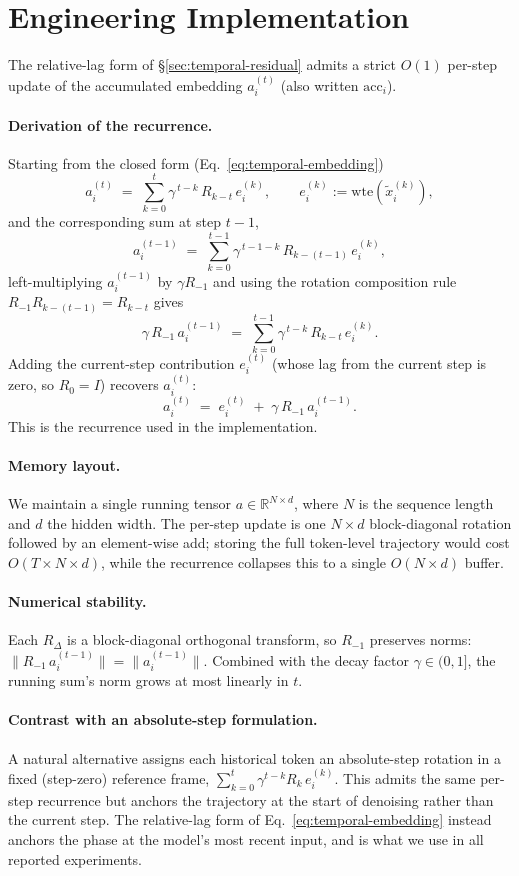 \section{Engineering Implementation}
\label{app:rope-engineering}

The relative-lag form of \S\ref{sec:temporal-residual} admits a strict $O(1)$ per-step update of the accumulated embedding $a_i^{(t)}$ (also written $\mathrm{acc}_i$).

\paragraph{Derivation of the recurrence.}
Starting from the closed form (Eq.~\eqref{eq:temporal-embedding})
\[
a_i^{(t)} \;=\; \sum_{k=0}^{t} \gamma^{\,t-k}\, R_{k-t}\, e_i^{(k)},
\qquad
e_i^{(k)} := \mathrm{wte}(\tilde{x}_i^{(k)}),
\]
and the corresponding sum at step $t-1$,
\[
a_i^{(t-1)} \;=\; \sum_{k=0}^{t-1} \gamma^{\,t-1-k}\, R_{k-(t-1)}\, e_i^{(k)},
\]
left-multiplying $a_i^{(t-1)}$ by $\gamma R_{-1}$ and using the rotation composition rule $R_{-1} R_{k-(t-1)} = R_{k-t}$ gives
\[
\gamma\, R_{-1}\, a_i^{(t-1)} \;=\; \sum_{k=0}^{t-1} \gamma^{\,t-k}\, R_{k-t}\, e_i^{(k)}.
\]
Adding the current-step contribution $e_i^{(t)}$ (whose lag from the current step is zero, so $R_0 = I$) recovers $a_i^{(t)}$:
\[
a_i^{(t)} \;=\; e_i^{(t)} \;+\; \gamma\, R_{-1}\, a_i^{(t-1)}.
\]
This is the recurrence used in the implementation.

\paragraph{Memory layout.}
We maintain a single running tensor $a \in \mathbb{R}^{N \times d}$, where $N$ is the sequence length and $d$ the hidden width. The per-step update is one $N \times d$ block-diagonal rotation followed by an element-wise add; storing the full token-level trajectory would cost $O(T \times N \times d)$, while the recurrence collapses this to a single $O(N \times d)$ buffer.

\paragraph{Numerical stability.}
Each $R_\Delta$ is a block-diagonal orthogonal transform, so $R_{-1}$ preserves norms: $\|R_{-1}\, a_i^{(t-1)}\| = \|a_i^{(t-1)}\|$. Combined with the decay factor $\gamma \in (0, 1]$, the running sum's norm grows at most linearly in $t$.

\paragraph{Contrast with an absolute-step formulation.}
A natural alternative assigns each historical token an absolute-step rotation in a fixed (step-zero) reference frame, $\sum_{k=0}^{t} \gamma^{t-k} R_k\, e_i^{(k)}$. This admits the same per-step recurrence but anchors the trajectory at the start of denoising rather than the current step. The relative-lag form of Eq.~\eqref{eq:temporal-embedding} instead anchors the phase at the model's most recent input, and is what we use in all reported experiments.

